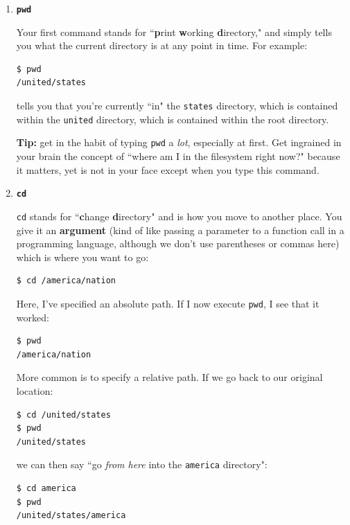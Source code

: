 \begin{enumerate}
\itemsep.1em
\item \textbf{\texttt{pwd}}

Your first command stands for ``\textbf{p}rint \textbf{w}orking
\textbf{d}irectory," and simply tells you what the current directory is at any
point in time. For example:

\begin{verbatim}
$ pwd
/united/states
\end{verbatim}

tells you that you're currently ``in" the \texttt{states} directory, which is
contained within the \texttt{united} directory, which is contained within the
root directory.

\textbf{Tip:} get in the habit of typing \texttt{pwd} a \textit{lot},
especially at first. Get ingrained in your brain the concept of ``where am I
in the filesystem right now?" because it matters, yet is not in your face
except when you type this command.

\bigline
\item \textbf{\texttt{cd}}

\texttt{cd} stands for ``\textbf{c}hange \textbf{d}irectory" and is how you
move to another place. You give it an \textbf{argument} (kind of like passing
a parameter to a function call in a programming language, although we don't
use parentheses or commas here) which is where you want to go:

\begin{verbatim}
$ cd /america/nation
\end{verbatim}

Here, I've specified an absolute path. If I now execute \texttt{pwd}, I see
that it worked:
\begin{verbatim}
$ pwd
/america/nation
\end{verbatim}

More common is to specify a relative path. If we go back to our original
location:

\begin{verbatim}
$ cd /united/states
$ pwd
/united/states
\end{verbatim}

we can then say ``go \textit{from here} into the \texttt{america} directory":

\begin{verbatim}
$ cd america
$ pwd
/united/states/america
\end{verbatim}


\end{enumerate}
